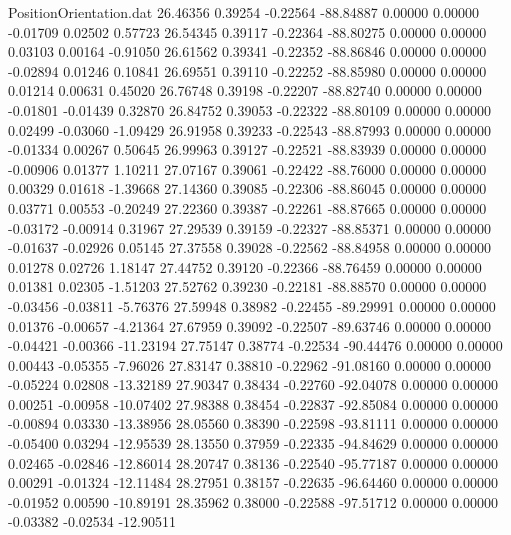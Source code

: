 \begin{filecontents}{PositionOrientation.dat}
  26.46356    0.39254   -0.22564   -88.84887    0.00000    0.00000   -0.01709    0.02502    0.57723
  26.54345    0.39117   -0.22364   -88.80275    0.00000    0.00000    0.03103    0.00164   -0.91050
  26.61562    0.39341   -0.22352   -88.86846    0.00000    0.00000   -0.02894    0.01246    0.10841
  26.69551    0.39110   -0.22252   -88.85980    0.00000    0.00000    0.01214    0.00631    0.45020
  26.76748    0.39198   -0.22207   -88.82740    0.00000    0.00000   -0.01801   -0.01439    0.32870
  26.84752    0.39053   -0.22322   -88.80109    0.00000    0.00000    0.02499   -0.03060   -1.09429
  26.91958    0.39233   -0.22543   -88.87993    0.00000    0.00000   -0.01334    0.00267    0.50645
  26.99963    0.39127   -0.22521   -88.83939    0.00000    0.00000   -0.00906    0.01377    1.10211
  27.07167    0.39061   -0.22422   -88.76000    0.00000    0.00000    0.00329    0.01618   -1.39668
  27.14360    0.39085   -0.22306   -88.86045    0.00000    0.00000    0.03771    0.00553   -0.20249
  27.22360    0.39387   -0.22261   -88.87665    0.00000    0.00000   -0.03172   -0.00914    0.31967
  27.29539    0.39159   -0.22327   -88.85371    0.00000    0.00000   -0.01637   -0.02926    0.05145
  27.37558    0.39028   -0.22562   -88.84958    0.00000    0.00000    0.01278    0.02726    1.18147
  27.44752    0.39120   -0.22366   -88.76459    0.00000    0.00000    0.01381    0.02305   -1.51203
  27.52762    0.39230   -0.22181   -88.88570    0.00000    0.00000   -0.03456   -0.03811   -5.76376
  27.59948    0.38982   -0.22455   -89.29991    0.00000    0.00000    0.01376   -0.00657   -4.21364
  27.67959    0.39092   -0.22507   -89.63746    0.00000    0.00000   -0.04421   -0.00366  -11.23194
  27.75147    0.38774   -0.22534   -90.44476    0.00000    0.00000    0.00443   -0.05355   -7.96026
  27.83147    0.38810   -0.22962   -91.08160    0.00000    0.00000   -0.05224    0.02808  -13.32189
  27.90347    0.38434   -0.22760   -92.04078    0.00000    0.00000    0.00251   -0.00958  -10.07402
  27.98388    0.38454   -0.22837   -92.85084    0.00000    0.00000   -0.00894    0.03330  -13.38956
  28.05560    0.38390   -0.22598   -93.81111    0.00000    0.00000   -0.05400    0.03294  -12.95539
  28.13550    0.37959   -0.22335   -94.84629    0.00000    0.00000    0.02465   -0.02846  -12.86014
  28.20747    0.38136   -0.22540   -95.77187    0.00000    0.00000    0.00291   -0.01324  -12.11484
  28.27951    0.38157   -0.22635   -96.64460    0.00000    0.00000   -0.01952    0.00590  -10.89191
  28.35962    0.38000   -0.22588   -97.51712    0.00000    0.00000   -0.03382   -0.02534  -12.90511

\end{filecontents}
